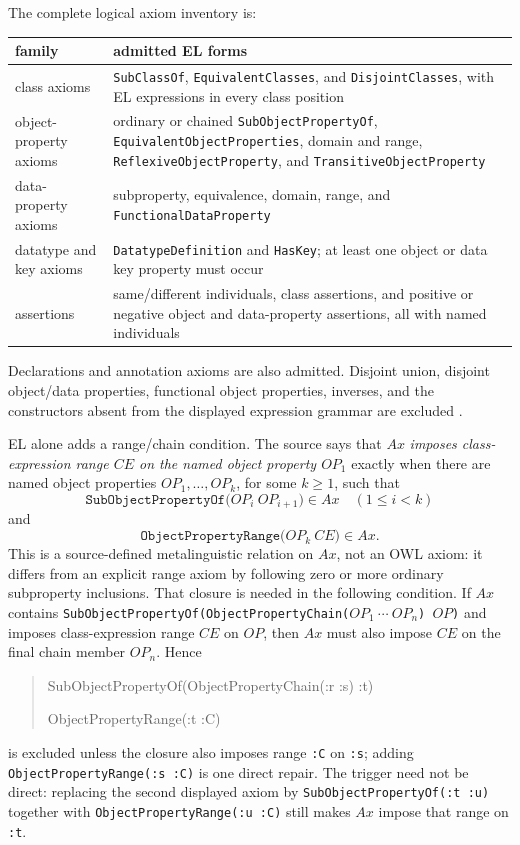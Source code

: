 The complete logical axiom inventory is:
\begin{center}
\small
\begin{tabularx}{\textwidth}{@{}l X@{}}
\toprule
family & admitted EL forms\\
\midrule
class axioms &
\texttt{SubClassOf}, \texttt{EquivalentClasses}, and
\texttt{DisjointClasses}, with EL expressions in every class position\\
object-property axioms &
ordinary or chained \texttt{SubObjectPropertyOf},
\texttt{EquivalentObjectProperties}, domain and range,
\texttt{ReflexiveObjectProperty}, and
\texttt{TransitiveObjectProperty}\\
data-property axioms &
subproperty, equivalence, domain, range, and
\texttt{FunctionalDataProperty}\\
datatype and key axioms &
\texttt{DatatypeDefinition} and \texttt{HasKey}; at least one object or data
key property must occur\\
assertions &
same/different individuals, class assertions, and positive or negative object
and data-property assertions, all with named individuals\\
\bottomrule
\end{tabularx}
\end{center}
Declarations and annotation axioms are also admitted.  Disjoint union,
disjoint object/data properties, functional object properties, inverses, and
the constructors absent from the displayed expression grammar are excluded
\cite[\S2.2 and app.~6.1]{W3COWL2Profiles2012}.

EL alone adds a range/chain condition.  The source says that \(Ax\)
\emph{imposes class-expression range \(CE\) on the named object property
\(OP_1\)} exactly when there are named object properties
\(OP_1,\ldots,OP_k\), for some \(k\geq1\), such that
\[
 \texttt{SubObjectPropertyOf(\(OP_i\ OP_{i+1}\))}\in Ax
 \quad(1\leq i<k)
\]
and
\[
 \texttt{ObjectPropertyRange(\(OP_k\ CE\))}\in Ax.
\]
This is a source-defined metalinguistic relation on \(Ax\), not an OWL axiom:
it differs from an explicit range axiom by following zero or more ordinary
subproperty inclusions.  That closure is needed in the following condition.
If \(Ax\) contains
\texttt{SubObjectPropertyOf(ObjectPropertyChain(\(OP_1\ \cdots\ OP_n\)) \(OP\))}
and imposes class-expression range \(CE\) on \(OP\), then \(Ax\) must also
impose \(CE\) on the final chain member \(OP_n\).  Hence
\begin{quote}\small\ttfamily
SubObjectPropertyOf(ObjectPropertyChain(:r :s) :t)\par
ObjectPropertyRange(:t :C)
\end{quote}
is excluded unless the closure also imposes range \texttt{:C} on
\texttt{:s}; adding \texttt{ObjectPropertyRange(:s :C)} is one direct repair.
The trigger need not be direct: replacing the second displayed axiom by
\texttt{SubObjectPropertyOf(:t :u)} together with
\texttt{ObjectPropertyRange(:u :C)} still makes \(Ax\) impose that range on
\texttt{:t}.

